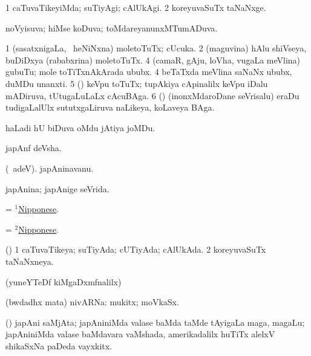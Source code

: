 \bentry
{}
\gl{\kirxvi}
\bmng
\bnum
\num{1} caTuvaTikeyiMda; suTiyAgi; cAlUkAgi. 
\num{2} koreyuvaSuTx taNaNxge. 
\enum
\emng
\eentry

\bentry
{}
\gl{\gu}
\bmng
noVyisuva; hiMse koDuva; toMdareyanunxMTumADuva. 
\emng
\eentry

\bentry
{}
\gl{\nA}
\bmng
\bnum
\num{1} (sasatxnigaLa, \kanmu\ heNiNxna) moletoTuTx; cUcuka. 
\num{2} (maguvina) hAlu shiVseya, buDiDxya (rababxrina) moletoTuTx. 
\num{4} (camaR, gAju, loVha, \mo vugaLa meVlina) gubuTu; mole toTiTxnAkArada ububx. 
\num{4} beTaTxda meVlina saNaNx ububx, duMDu unanxti. 
\num{5} (\ca) keVpu toTuTx; tupAkiya cApinalilx keVpu iDalu mADiruva, tUtugaLuLaLx cAcuBAga. 
\num{6} (\ame) (inonxMdaroDane seVrisalu) eraDu tudigaLalUlx sututxgaLiruva naLikeya, koLaveya BAga. 
\enum
\emng
\eentry

\bentry
{}
\gl{\nA}
\bmng
haLadi hU biDuva oMdu jAtiya joMDu. 
\emng
\eentry

\bentry
{}
\gl{\nA}
\bmng
japAnf deVsha. 
\emng
\eentry

\bentry
{}
\gl{\nA}
\bmng
(\bava\ adeV). japAninavanu. 
\emng
\eentry

\bentry
{}
\gl{\gu}
\bmng
japAnina; japAnige seVrida. 
\emng
\eentry

\bentry
{}
\gl{\nA}
\bmng
= \hyperlink{Nipponese(1)}{$^1$Nipponese}. 
\emng
\eentry

\bentry
{}
\gl{\gu}
\bmng
= \hyperlink{Nipponese(2)}{$^2$Nipponese}. 
\emng
\eentry

\bentry
{}
\gl{\gu}
\bmng
(\AmA) 
\bnum
\num{1} caTuvaTikeya; suTiyAda; cUTiyAda; cAlUkAda. 
\num{2} koreyuvaSuTx taNaNxneya. 
\enum
\emng
\eentry

\bentry
{}
\gl{\saMkiSx}
\bmng
(yuneYTeDf kiMgaDxmfnalilx)  
\emng
\eentry

\bentry
{}
\gl{\nA}
\bmng
(bwdadhx mata) nivARNa: mukitx; moVkaSx. 
\emng
\eentry

\bentry
{}
\gl{\nA}
\bmng
(\ame) japAni saMjAta; japAniniMda valase baMda taMde tAyigaLa maga, magaLu; japAniniMda valase baMdavara vaMshada, amerikadalilx huTiTx alelxV shikaSxNa paDeda vayxkitx. 
\emng
\eentry


